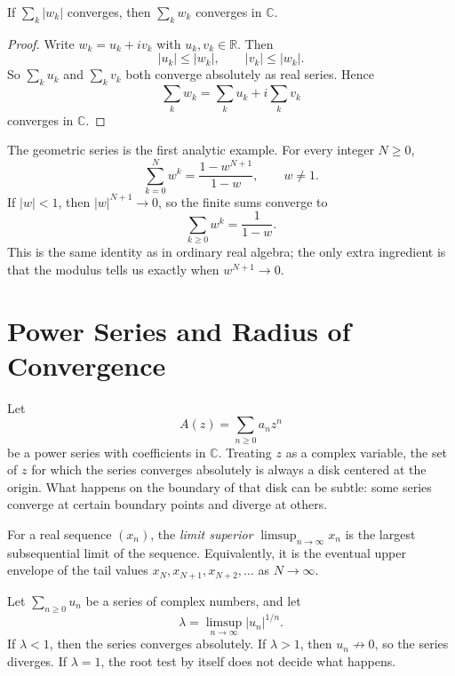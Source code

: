 \begin{proposition}
If $\sum_k |w_k|$ converges, then $\sum_k w_k$ converges in $\mathbb{C}$.
\end{proposition}

\begin{proof}
Write $w_k = u_k + iv_k$ with $u_k,v_k \in \mathbb{R}$. Then
\[
  |u_k| \le |w_k|, \qquad |v_k| \le |w_k|.
\]
So $\sum_k u_k$ and $\sum_k v_k$ both converge absolutely as real series. Hence
\[
  \sum_k w_k = \sum_k u_k + i\sum_k v_k
\]
converges in $\mathbb{C}$.
\end{proof}

The geometric series is the first analytic example. For every integer $N \ge 0$,
\[
  \sum_{k=0}^{N} w^k = \frac{1-w^{N+1}}{1-w}, \qquad w \ne 1.
\]
If $|w|<1$, then $|w|^{N+1} \to 0$, so the finite sums converge to
\[
  \sum_{k \ge 0} w^k = \frac{1}{1-w}.
\]
This is the same identity as in ordinary real algebra; the only extra ingredient is that the modulus tells us exactly when $w^{N+1} \to 0$.

\section{Power Series and Radius of Convergence}

Let
\[
  A(z) = \sum_{n \ge 0} a_n z^n
\]
be a power series with coefficients in $\mathbb{C}$. Treating $z$ as a complex variable, the set of $z$ for which the series converges absolutely is always a disk centered at the origin. What happens on the boundary of that disk can be subtle: some series converge at certain boundary points and diverge at others.

\begin{definition}
For a real sequence $(x_n)$, the \emph{limit superior} $\limsup_{n \to \infty} x_n$ is the largest subsequential limit of the sequence. Equivalently, it is the eventual upper envelope of the tail values $x_N,x_{N+1},x_{N+2},\dots$ as $N \to \infty$.
\end{definition}

\begin{theorem}
Let $\sum_{n \ge 0} u_n$ be a series of complex numbers, and let
\[
  \lambda = \limsup_{n \to \infty} |u_n|^{1/n}.
\]
If $\lambda < 1$, then the series converges absolutely. If $\lambda > 1$, then $u_n \not\to 0$, so the series diverges.
If $\lambda = 1$, the root test by itself does not decide what happens.
\end{theorem}

